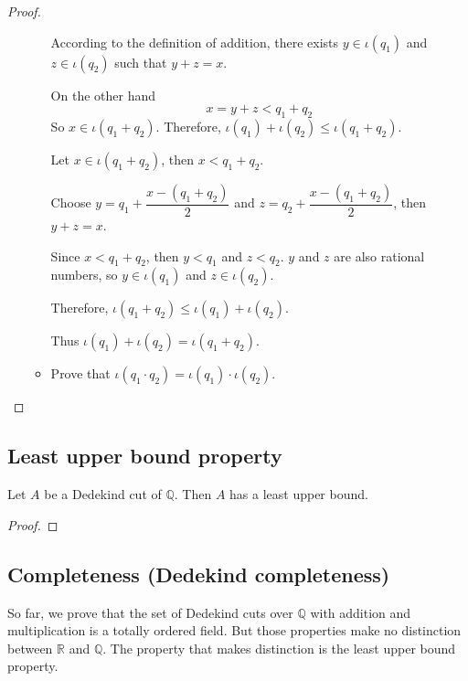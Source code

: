 \begin{proof}
\begin{itemize}
\begin{itemize}
                        According to the definition of addition, there exists $y\in\iota(q_{1})$ and $z\in\iota(q_{2})$ such that $y + z = x$.

                        On the other hand
                        \[
                            x = y + z < q_{1} + q_{2}
                        \]
                        So $x\in\iota(q_{1} + q_{2})$. Therefore, $\iota(q_{1}) + \iota(q_{2})\le\iota(q_{1} + q_{2})$.
                        \bigskip

                        Let $x\in\iota(q_{1} + q_{2})$, then $x < q_{1} + q_{2}$.

                        Choose $y = q_{1} + \dfrac{x - (q_{1} + q_{2})}{2}$ and $z = q_{2} + \dfrac{x - (q_{1} + q_{2})}{2}$, then $y + z = x$.

                        Since $x < q_{1} + q_{2}$, then $y < q_{1}$ and $z < q_{2}$. $y$ and $z$ are also rational numbers, so $y\in\iota(q_{1})$ and $z\in\iota(q_{2})$.

                        Therefore, $\iota(q_{1} + q_{2})\le\iota(q_{1}) + \iota(q_{2})$.

                        Thus $\iota(q_{1}) + \iota(q_{2}) = \iota(q_{1} + q_{2})$.
                  \item Prove that $\iota(q_{1}\cdot q_{2}) = \iota(q_{1})\cdot\iota(q_{2})$.
              \end{itemize}
    \end{itemize}
\end{proof}

\subsection{Least upper bound property}

\begin{theorem}
    Let $A$ be a Dedekind cut of $\mathbb{Q}$. Then $A$ has a least upper bound.
\end{theorem}

\begin{proof}
\end{proof}

\subsection{Completeness (Dedekind completeness)}

So far, we prove that the set of Dedekind cuts over $\mathbb{Q}$ with addition and multiplication is a totally ordered field. But those properties make no distinction between $\mathbb{R}$ and $\mathbb{Q}$. The property that makes distinction is the least upper bound property.

